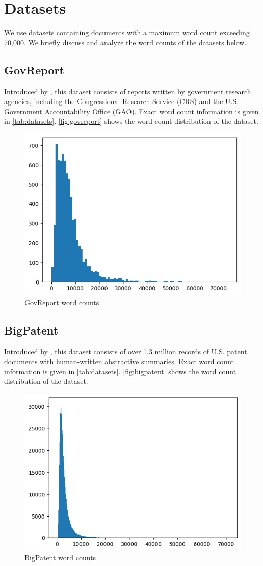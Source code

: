 \section{Datasets}
	\label{sec:datasets}

	We use datasets containing documents with a maximum word count exceeding 70,000.
	We briefly discuss and analyze the word counts of the datasets below.


\subsection*{GovReport}

	Introduced by \citet{huang-etal-2021-efficient}, this dataset consists of reports written
	by government research agencies, including the Congressional Research Service (CRS) and
	the U.S. Government Accountability Office (GAO).
	Exact word count information is given in \autoref{tab:datasets}.
	\autoref{fig:govreport} shows the word count distribution of the dataset.

	\begin{figure}[!ht]
		\centering
		\includegraphics[width=.48\textwidth]{Images/govreport-wordcount.png}
		\caption{GovReport word counts}
		\label{fig:govreport}
	\end{figure}


\subsection*{BigPatent}

	Introduced by \citet{sharma-etal-2019-bigpatent}, this dataset consists of over 1.3 million
	records of U.S. patent documents with human-written abstractive summaries.
	Exact word count information is given in \autoref{tab:datasets}.
	\autoref{fig:bigpatent} shows the word count distribution of the dataset.

	\begin{figure}[!ht]
		\centering
		\includegraphics[width=.48\textwidth]{Images/bigpatent-wordcount.png}
		\caption{BigPatent word counts}
		\label{fig:bigpatent}
	\end{figure}


